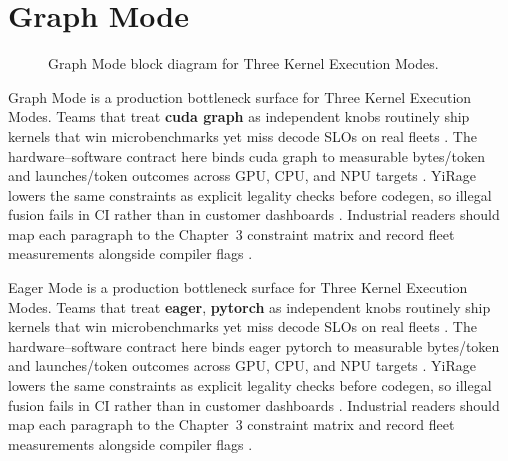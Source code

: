 \section{Graph Mode}
\label{sec:graph_mode}
\begin{figure}[t]
\centering
{}
\caption{Graph Mode block diagram for Three Kernel Execution Modes.}
\label{fig:graph_mode_architecture}
\end{figure}


Graph Mode is a production bottleneck surface for Three Kernel Execution Modes. Teams that treat \textbf{cuda graph} as independent knobs routinely ship kernels that win microbenchmarks yet miss decode SLOs on real fleets \citep{taxbreak2026,semianalysis2024tma}. The hardware--software contract here binds cuda graph to measurable bytes/token and launches/token outcomes across GPU, CPU, and NPU targets \citep{memoryfloor2026,amd2024xdna}. YiRage lowers the same constraints as explicit legality checks before codegen, so illegal fusion fails in CI rather than in customer dashboards \citep{nvidia2022hopper,amd2024aie}. Industrial readers should map each paragraph to the Chapter~3 constraint matrix and record fleet measurements alongside compiler flags \citep{semianalysis2024tma,dlbook}.

Eager Mode is a production bottleneck surface for Three Kernel Execution Modes. Teams that treat \textbf{eager}, \textbf{pytorch} as independent knobs routinely ship kernels that win microbenchmarks yet miss decode SLOs on real fleets \citep{liu2024deepseekv3,memoryfloor2026}. The hardware--software contract here binds eager pytorch to measurable bytes/token and launches/token outcomes across GPU, CPU, and NPU targets \citep{patel2025llminference,nvidia2022hopper}. YiRage lowers the same constraints as explicit legality checks before codegen, so illegal fusion fails in CI rather than in customer dashboards \citep{taxbreak2026,semianalysis2024tma}. Industrial readers should map each paragraph to the Chapter~3 constraint matrix and record fleet measurements alongside compiler flags \citep{memoryfloor2026,amd2024xdna}.

